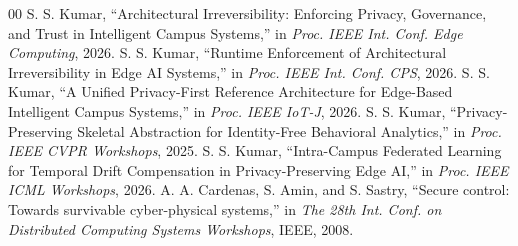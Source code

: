 \documentclass[conference]{IEEEtran}
\begin{document}
\begin{thebibliography}{00}
 S. S. Kumar, ``Architectural Irreversibility: Enforcing Privacy, Governance, and Trust in Intelligent Campus Systems,'' in \textit{Proc. IEEE Int. Conf. Edge Computing}, 2026.
 S. S. Kumar, ``Runtime Enforcement of Architectural Irreversibility in Edge AI Systems,'' in \textit{Proc. IEEE Int. Conf. CPS}, 2026.
 S. S. Kumar, ``A Unified Privacy-First Reference Architecture for Edge-Based Intelligent Campus Systems,'' in \textit{Proc. IEEE IoT-J}, 2026.
 S. S. Kumar, ``Privacy-Preserving Skeletal Abstraction for Identity-Free Behavioral Analytics,'' in \textit{Proc. IEEE CVPR Workshops}, 2025.
 S. S. Kumar, ``Intra-Campus Federated Learning for Temporal Drift Compensation in Privacy-Preserving Edge AI,'' in \textit{Proc. IEEE ICML Workshops}, 2026.
 A. A. Cardenas, S. Amin, and S. Sastry, ``Secure control: Towards survivable cyber-physical systems,'' in \textit{The 28th Int. Conf. on Distributed Computing Systems Workshops}, IEEE, 2008.

\end{thebibliography}
\end{document}
